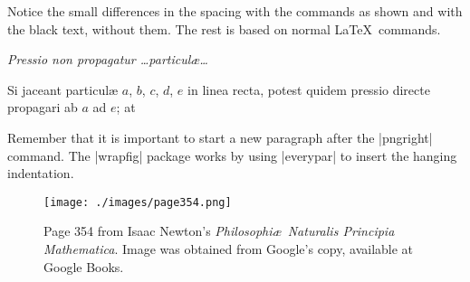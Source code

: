 \vspace*{-37pt}


Notice the small differences in the spacing with the commands as shown and with the black text, without them. The rest is based on normal \LaTeX\ commands.

\textit{Pressio non propagatur \ldots particul{\ae}\ldots}


Si jaceant particul{\ae} $a$, $b$, $c$, $d$,
$e$ in linea recta, potest quidem
pressio directe propagari ab $a$ ad $e$; at


Remember that it is important to start a new paragraph after the 
|pngright| command. The |wrapfig| package works by using |everypar| to insert the hanging indentation.

\begin{figure}[p]
\centering
\texttt{[image: ./images/page354.png]}
\caption{Page 354 from Isaac Newton's \textit{Philosophi\ae\  Naturalis Principia Mathematica}. Image was obtained from Google's copy, available at Google Books.}
\label{fig:principia}
\end{figure}
